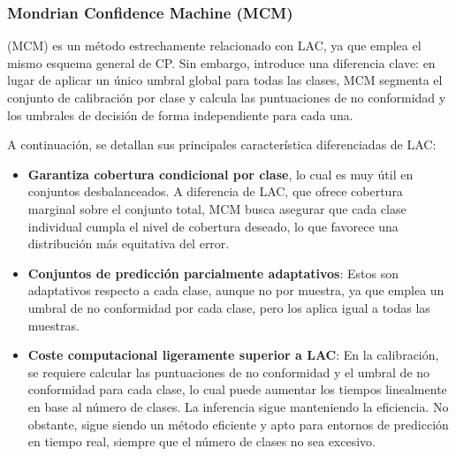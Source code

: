 

\subsubsection{Mondrian Confidence Machine (MCM)}

(MCM) \cite{vovk2003} es un método estrechamente relacionado con LAC, ya que emplea el mismo esquema general de CP. Sin embargo, introduce una diferencia clave: en lugar de aplicar un único umbral global para todas las clases, MCM segmenta el conjunto de calibración por clase y calcula las puntuaciones de no conformidad y los umbrales de decisión de forma independiente para cada una.

A continuación, se detallan sus principales característica diferenciadas de LAC:

\begin{itemize}

    \item \textbf{Garantiza cobertura condicional por clase}, lo cual es muy útil en conjuntos desbalanceados. A diferencia de LAC, que ofrece cobertura marginal sobre el conjunto total, MCM busca asegurar que cada clase individual cumpla el nivel de cobertura deseado, lo que favorece una distribución más equitativa del error.
    
    \item \textbf{Conjuntos de predicción parcialmente adaptativos}: Estos son adaptativos respecto a cada clase, aunque no por muestra, ya que emplea un umbral de no conformidad por cada clase, pero los aplica igual a todas las muestras.  

    \item \textbf{Coste computacional ligeramente superior a LAC}: En la calibración, se requiere calcular las puntuaciones de no conformidad y el umbral de no conformidad para cada clase, lo cual puede aumentar los tiempos linealmente en base al número de clases. La inferencia sigue manteniendo la eficiencia. No obstante, sigue siendo un método eficiente y apto para entornos de predicción en tiempo real, siempre que el número de clases no sea excesivo.

\end{itemize}


